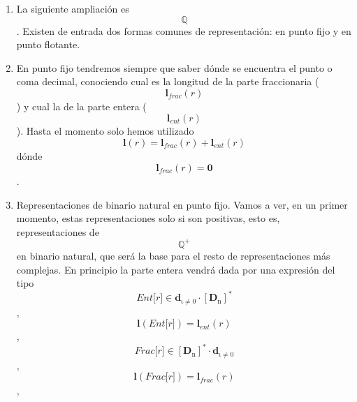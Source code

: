 \documentclass[
]{article}
\begin{document}
\begin{enumerate}
\begin{enumerate}
\begin{enumerate}
      Y así queda definido el lenguaje de las representaciones en
      complemento a una base y su semántica de valores en
      \[\mathbb{Z}\].
    \item
      Exceso a \[\mathit{n}\]. Este tipo de representación no necesita
      signo siendo, el valor de la representación su valor en binario
      natural menos \[\mathit{n}\]. La representación
      \[\mathbf{0}\]tiene como valor \[- \mathit{n}\]. En general el
      valor de la representación \[\mathit{r}\] en Exceso a
      \[\mathit{n}\]será \[{\mathbf{\nu}{(\mathit{r})}} - \mathit{n}\],
      siendo la función \[{valor} - \nu\] la correspondiente al
      bina\-rio natural.
    \end{enumerate}
  \item
    La siguiente ampliación es \[\mathbb{Q}\]. Existen de entrada dos
    formas comunes de repre\-sentación: en punto fijo y en punto
    flotante.
  \item
    En punto fijo tendremos siempre que saber dónde se encuentra el
    punto o coma deci\-mal, conociendo cual es la longitud de la parte
    fraccionaria
    (\[\mathbf{l}_{\mathbf{\mathrm{\mathit{frac}}}}{(\mathit{r})}\]) y
    cual la de la parte entera
    (\[\mathbf{l}_{\mathbf{\mathrm{\mathit{ent}}}}{(\mathit{r})}\]).
    Hasta el momento solo hemos utilizado
    \[\mathbf{l}{{(\mathit{r})} = \mathbf{l}_{\mathbf{\mathrm{\mathit{frac}}}}}{{(\mathit{r})} + \mathbf{l}_{\mathbf{\mathrm{\mathit{ent}}}}}{(\mathit{r})}\]dónde
    \[\mathbf{l}_{\mathbf{\mathrm{\mathit{frac}}}}{{(\mathit{r})} = \mathbf{0}}\].
  \item
    Representaciones de binario natural en punto fijo. Vamos a ver, en
    un primer mo\-mento, estas representaciones solo si son positivas,
    esto es, representaciones de \[\mathbb{Q}^{\mathbf{\mathrm{+}}}\]en
    binario natural, que será la base para el resto de representaciones
    más com\-plejas. En principio la parte entera vendrá dada por una
    expresión del tipo
    \[\mathit{{Ent}{\lbrack r\rbrack}} \in {\mathbf{d}_{\mathbf{\mathrm{\iota \neq 0}}} \cdot \left\lbrack \mathbf{D}_{\mathbf{\mathrm{n}}} \right\rbrack^{\mathbf{\mathrm{\ast}}}}\],
    \[{\mathbf{l}{(\mathit{{Ent}{\lbrack r\rbrack}})}} = {\mathbf{l}_{\mathbf{\mathrm{\mathit{ent}}}}{(\mathit{r})}}\],
    \[\mathit{{Frac}{\lbrack r\rbrack}} \in {\left\lbrack \mathbf{D}_{\mathbf{\mathrm{n}}} \right\rbrack^{\mathbf{\mathrm{\ast}}} \cdot \mathbf{d}_{\mathbf{\mathrm{\iota \neq 0}}}}\],
    \[{\mathbf{l}{(\mathit{{Frac}{\lbrack r\rbrack}})}} = {\mathbf{l}_{\mathbf{\mathrm{\mathit{frac}}}}{(\mathit{r})}}\],

\end{enumerate}
\end{enumerate}
\end{document}
